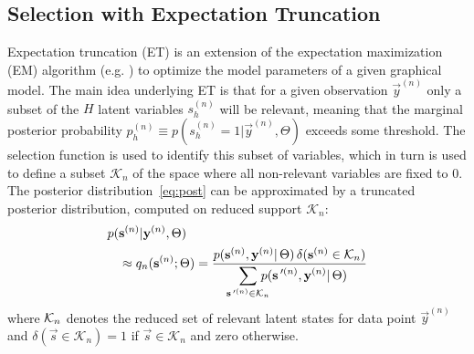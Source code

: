 %

\subsection{Selection with Expectation Truncation}
%
Expectation truncation (ET) is an extension of the expectation maximization (EM) algorithm (e.g. \citep{DempsterEtAl1977,
NealHinton1998}) to optimize the model parameters of a given graphical model.
%
The main idea underlying ET is that for a given observation $\vec{y}^{(n)}$
only a subset of the $H$ latent variables $s_h^{(n)}$ will be relevant, meaning
that the marginal posterior probability $p^{(n)}_h \equiv p(s^{(n)}_h = 1|\vec{y}^{(n)}, \Theta)$
exceeds some threshold. 
The selection function is used to identify this subset
of variables, which in turn is used to define a subset $\mathcal{K}_n$ of the space 
where all non-relevant variables are fixed to 0.
%
The posterior distribution~\eqref{eq:post} can be approximated by a truncated posterior distribution, computed on reduced support $\mathcal{K}_n$:
%
\vspace{-.1cm}
\begin{align}
\label{eq:sel-post}
p(&\vec{s}^{(n)}|\vec{y}^{(n)},\Theta) \nonumber\\
&\approx q_n(\vec{s}^{(n)};\Theta) = \frac{p(\vec{s}^{(n)},\vec{y}^{(n)}|\,\Theta) \,\delta(\vec{s}^{(n)}\in\hspace{-.05mm}\Kn)}
{\disS\hspace{-1.5mm}\sum_{\vec{s}\Prime^{(n)}\in\mathcal{K}_n}\hspace{-3mm} p(\vec{s}\Prime^{(n)},\vec{y}^{(n)}|\,\Theta)}
\end{align}
\normalsize
%
where $\mathcal{K}_{n}$ denotes the reduced set of relevant latent states for data point
$\vec{y}^{(n)}$ and $\delta(\vec{s}\in\mathcal{K}_n)=1$ if
$\vec{s}\in\mathcal{K}_n$ and zero otherwise.

%



